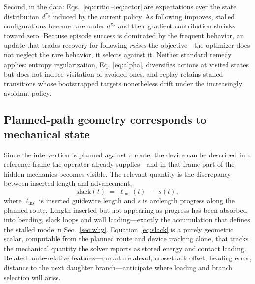Second, in the data: Eqs.~\eqref{eq:critic}--\eqref{eq:actor} are expectations over the state
distribution $d^{\pi_{\phi}}$ induced by the current policy. As following improves, stalled
configurations become rare under $d^{\pi_{\phi}}$ and their gradient contribution shrinks toward
zero.
Because episode success is dominated by the frequent behavior, an update that trades recovery for
following \emph{raises} the objective---the optimizer does not neglect the rare behavior, it
selects against it. Neither standard remedy applies: entropy regularization, Eq.~\eqref{eq:alpha},
diversifies actions at visited states but does not induce visitation of avoided ones, and replay
retains stalled transitions whose bootstrapped targets nonetheless drift under the increasingly
avoidant policy.

\subsection{Planned-path geometry corresponds to mechanical state}
\label{sec:correspondence}


Since the intervention is planned against a route, the device can be described in a reference
frame the operator already supplies---and in that frame part of the hidden mechanics becomes
visible. The relevant quantity is the discrepancy between inserted length and advancement,
%
\begin{equation}
\mathrm{slack}(t) \;=\; \ell_{\mathrm{ins}}(t) \;-\; s(t),
\label{eq:slack}
\end{equation}
%
where $\ell_{\mathrm{ins}}$ is inserted guidewire length and $s$ is arclength progress along the
planned route. Length inserted but not appearing as progress has been absorbed into bending, slack
loops and wall loading---exactly the accumulation that defines the stalled mode in
Sec.~\ref{sec:why}. Equation~\eqref{eq:slack} is a purely geometric scalar, computable from the
planned route and device tracking alone, that tracks the mechanical quantity the solver reports as
stored energy and contact loading. Related route-relative features---curvature ahead, cross-track
offset, heading error, distance to the next daughter branch---anticipate where loading and branch
selection will arise.

